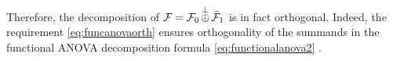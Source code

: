 Therefore, the decomposition of ${\mathcal F} = {\mathcal F}_0 \displaystyle\mathop{\oplus}^\bot \bar{{\mathcal F}}_1$ is in fact orthogonal. 
Indeed, the requirement \cref{eq:funcanovaorth} ensures orthogonality of the summands in the functional ANOVA decomposition formula \cref{eq:functionalanova2} \citep[Definition 1]{sobol2001global}.


%
